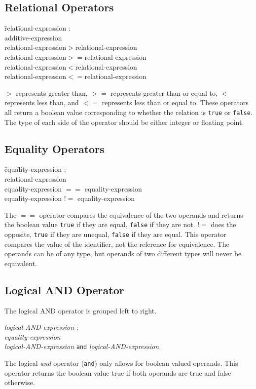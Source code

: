 \documentclass{article}
\begin{document}
\subsection{Relational Operators}
\begin{itshape}
\begin{tabbing}
	\= relat\=ional-expression : \\
		\>\> additive-expression \\
		\>\> relational-expression$>$relational-expression \\		
		\>\> relational-expression$>=$relational-expression \\
		\>\> relational-expression$<$relational-expression \\
		\>\> relational-expression$<=$relational-expression 
\end{tabbing}
\end{itshape}

$>$ represents greater than, $>=$ represents greater than or equal to, $<$ represents less than, and $<=$ represents less than or equal to. These operators all return a boolean value corresponding to whether the relation is \texttt{true} or \texttt{false}. The type of each side of the operator should be either integer or floating point.

\subsection{Equality Operators}
\begin{itshape}
\begin{tabbing}
	\= equa\=lity-expression : \\
		\>\> relational-expression \\
		\>\> equality-expression $==$ equality-expression \\		
		\>\> equality-expression $!=$ equality-expression
\end{tabbing}
\end{itshape}
The $==$ operator compares the equivalence of the two operands and returns the boolean value \texttt{true} if they are equal, \texttt{false} if they are not. $!=$ does the opposite, \texttt{true} if they are unequal, \texttt{false} if they are equal. This operator compares the value of the identifier, not the reference for equivalence. The operands can be of any type, but operands of two different types will never be equivalent.

\subsection{Logical AND Operator}
The logical AND operator is grouped left to right.
\begin{tabbing}
	\= \emph{logi}\=\emph{cal-AND-expression} : \\
		\>\> \emph{equality-expression} \\
		\>\> \emph{logical-AND-expression} \texttt{and} \emph{logical-AND-expression} 
\end{tabbing}
The logical \emph{and} operator (\texttt{and}) only allows for boolean valued operands. This operator returns the boolean value true if both operands are true and false otherwise. 
\end{document}
